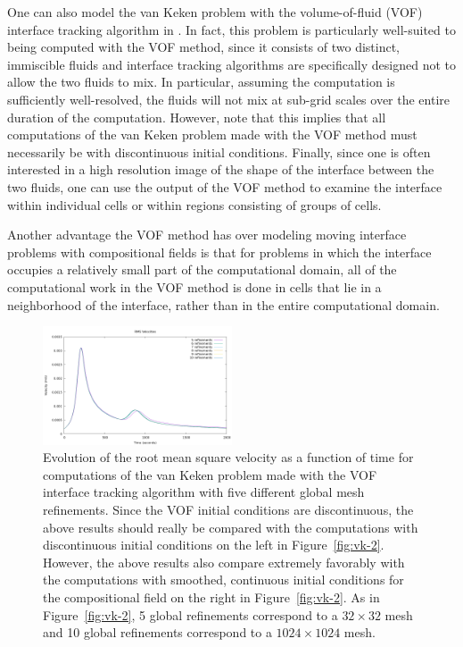 One can also model the van Keken problem with the volume-of-fluid (VOF) interface tracking 
algorithm in \aspect{}.
In fact, this problem is particularly well-suited to being computed with the VOF method, since 
it consists of two distinct, immiscible fluids and interface tracking algorithms are 
specifically designed not to allow the two fluids to mix.
In particular, assuming the computation is sufficiently well-resolved, the fluids will not mix 
at sub-grid scales over the entire duration of the computation.
However, note that this implies that all computations of the van Keken problem made with the VOF 
method must necessarily be with discontinuous initial conditions.
Finally, since one is often interested in a high resolution image of the shape of the interface 
between the two fluids, one can use the output of the VOF method to examine the interface 
within individual cells or within regions consisting of groups of cells.

Another advantage the VOF method has over modeling moving interface problems with compositional 
fields is that for problems in which the interface occupies a relatively small part of the 
computational domain, all of the computational work in the VOF method is done in cells that lie 
in a neighborhood of the interface, rather than in the entire computational domain. 

\begin{figure}
   \centering
\includegraphics[width=0.5\textwidth]{cookbooks/van-keken-vof/doc/rms_vel_comparison.png}
   \caption{Evolution of the root mean square velocity as a function of time for computations 
    of the van Keken problem made with the VOF interface tracking algorithm with five 
    different global mesh refinements.
    Since the VOF initial conditions are discontinuous, the above results should really be 
    compared with the computations with discontinuous initial conditions on the left in 
    Figure~\ref{fig:vk-2}. However, the above results also compare extremely favorably with the 
    computations with smoothed, continuous initial conditions for the compositional field on 
    the right in Figure~\ref{fig:vk-2}.
    As in Figure~\ref{fig:vk-2}, 5 global refinements correspond to a $32 \times 32$ mesh and 10 global refinements correspond to a $1024 \times 1024$ mesh.}
    \label{fig:vof-vk-1}
\end{figure}

